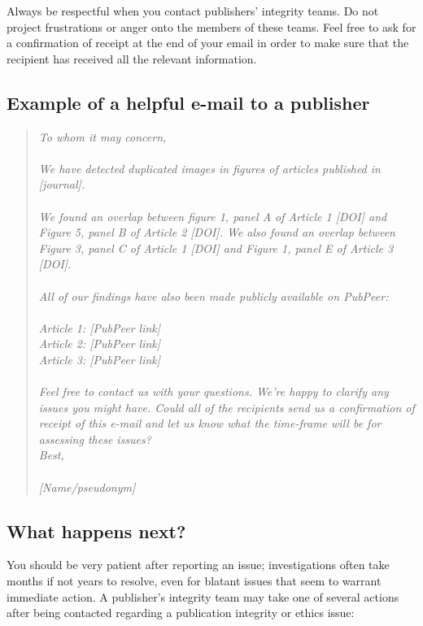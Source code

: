 \documentclass[letterpaper, 12pt]{article}
\begin{document}
Always be respectful when you contact publishers' integrity teams. Do not project frustrations or anger onto the members of these teams. Feel free to ask for a confirmation of receipt at the end of your email in order to make sure that the recipient has received all the relevant information.

\subsection*{Example of a helpful e-mail to a publisher}

\begin{quote}
\textit{To whom it may concern,}\\
\indent\\
\textit{We have detected duplicated images in figures of articles published in [journal].}\\
\indent\\
\textit{We found an overlap between figure 1, panel A of Article 1 [DOI] and Figure 5, panel B of Article 2 [DOI]. We also found an overlap between Figure 3, panel C of Article 1 [DOI] and Figure 1, panel E of Article 3 [DOI].}\\
\indent\\
\textit{All of our findings have also been made publicly available on PubPeer:}\\
\indent\\
\textit{Article 1: [PubPeer link]\\
Article 2: [PubPeer link]\\
Article 3: [PubPeer link]\\}
\indent\\
\textit{Feel free to contact us with your questions. We’re happy to clarify any issues you might have. Could all of the recipients send us a confirmation of receipt of this e-mail and let us know what the time-frame will be for assessing these issues?}\\
\indent
\textit{Best,}\\
\indent\\
\textit{[Name/pseudonym]}
\end{quote}

\subsection*{What happens next?}

You should be very patient after reporting an issue; investigations often take months if not years to resolve, even for blatant issues that seem to warrant immediate action. A publisher's integrity team may take one of several actions after being contacted regarding a publication integrity or ethics issue:
\end{document}
